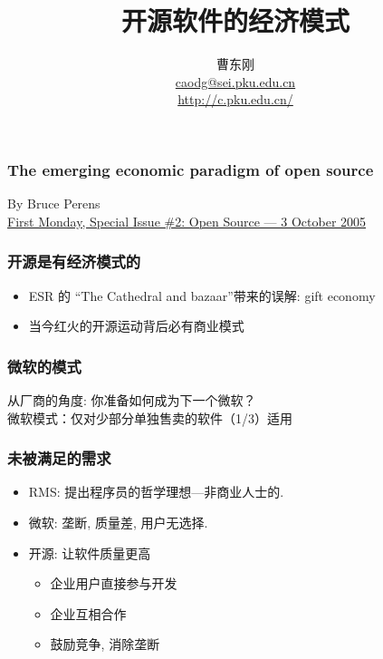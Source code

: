 \documentclass{beamer}
\begin{document}
					
\title{开源软件的经济模式}

\author[\href{http://c.pku.edu.cn/}{http://c.pku.edu.cn/}]
{曹东刚\\\href{mailto:caodg@sei.pku.edu.cn}{caodg@sei.pku.edu.cn}\\
\href{http://c.pku.edu.cn/}{
http://c.pku.edu.cn/}}

\date{}


\begin{frame}
	\titlepage
\end{frame}

\begin{frame}
\frametitle{The emerging economic paradigm of open source}
By Bruce Perens \\
\href{http://firstmonday.org/htbin/cgiwrap/bin/ojs/index.php/fm/article/viewArticle/1470/1385}{First
Monday, Special Issue \#2: Open Source — 3 October 2005}

\end{frame}

\begin{frame}
	\frametitle{开源是有经济模式的}
	\begin{itemize}
		\item ESR 的 ``The Cathedral and bazaar''带来的误解: gift economy
		\item 当今红火的开源运动背后必有商业模式
	\end{itemize}
\end{frame}

\begin{frame}
	\frametitle{微软的模式}
	从厂商的角度: 你准备如何成为下一个微软？ \\
	微软模式：仅对少部分单独售卖的软件（1/3）适用
\end{frame}

\begin{frame}
	\frametitle{未被满足的需求}
	\begin{itemize}
		\item RMS: 提出程序员的哲学理想---非商业人士的.
		\item 微软: 垄断, 质量差, 用户无选择.
		\item 开源: 让软件质量更高
			\begin{itemize}
				\item 企业用户直接参与开发
				\item 企业互相合作
				\item 鼓励竞争, 消除垄断
			\end{itemize}
	\end{itemize}
\end{frame}
\end{document}
